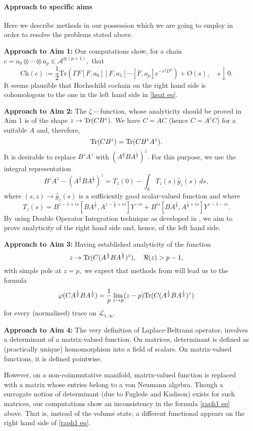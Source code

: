 \documentclass{article}
\begin{document}
\paragraph*{Approach to specific aims} Here we describe methods in our possession which we are going to employ in order to resolve the problems stated above.

{\bf Approach to Aim 1:} Our computations show, for a chain $c=a_0\otimes\cdots\otimes a_p\in\mathcal{A}^{\otimes (p+1)},$ that
$$\mathrm{Ch}(c) := \frac{1}{2}\mathrm{Tr}(\Gamma F[F,a_0][F,a_1]\cdots[F,a_p]e^{-s^2D^2})+O(s),\quad s\downarrow 0.$$
It seems plausible that Hochschild cochain on the right hand side is cohomologous to the one in the left hand side in \eqref{heat eq}.

{\bf Approach to Aim 2:} The $\zeta-$function, whose analyticity should be proved in Aim 1 is of the shape $z\to {\rm Tr}(CB^z).$ We have $C=AC$ (hence $C=A^zC$) for a suitable $A$ and, therefore,
$${\rm Tr}(CB^z)={\rm Tr}(CB^zA^z).$$
It is desirable to replace $B^zA^z$ with $(A^{\frac12}BA^{\frac12})^z.$ For this purpose, we use the integral representation
$$B^zA^z-(A^{\frac{1}{2}}BA^{\frac{1}{2}})^z = T_z(0)-\int_{\mathbb{R}} T_z(s)\widehat{g}_z(s)\,ds,$$ 
where $(s,z)\to\widehat{g}_z(s)$ is a sufficiently good scalar-valued function and where
$$T_z(s)= B^{z-1+is}[BA^{\frac{1}{2}},A^{z-\frac{1}{2}+is}]Y^{-is}+B^{is}[BA^{\frac{1}{2}},A^{\frac{1}{2}+is}]Y^{z-1-is}.$$
By using Double Operator Integration technique as developed in \cite{PotapovSukochev}, we aim to prove analyticity of the right hand side and, hence, of the left hand side.

{\bf Approach to Aim 3:} Having established analyticity of the function
$$z\to {\rm Tr}(C(A^{\frac12}BA^{\frac12})^z),\quad \Re(z)>p-1,$$
with simple pole at $z=p,$ we expect that methods from \cite{SUZ-indiana} will lead us to the formula
$$\varphi(CA^{\frac12}BA^{\frac12})=\frac1p\lim_{z\to p}(z-p){\rm Tr}(C(A^{\frac12}BA^{\frac12})^z)$$
for every (normalised) trace on $\mathcal{L}_{1,\infty}.$

{\bf Approach to Aim 4:} The very definition of Laplace-Beltrami operator, involves a determinant of a matrix-valued function. On matrices, determinant is defined as (practically unique) homomorphism into a field of scalars. On matrix-valued functions, it is defined pointwise.

However, on a non-coimmutative manifold, matrix-valued function is replaced with a matrix whose entries belong to a von Neumann algebra. Though a surrogate notion of determinant (due to Fuglede and Kadison) exists for such matrices, our computations show an inconsistency in the formula \eqref{raph1 eq} above. That is, instead of the volume state, a different functional appears on the right hand side of \eqref{raph1 eq}.
\end{document}
